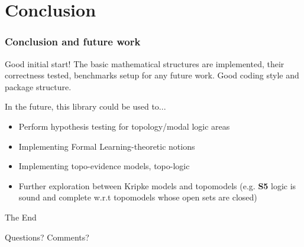\documentclass[
	11pt, %
	aspectratio=1610, %
]{beamer}
\begin{document}
\section{Conclusion}


\begin{frame}
	\frametitle{Conclusion and future work}

	Good initial start! The basic mathematical structures are implemented, their
	correctness tested, benchmarks setup for any future work. Good coding style and package structure.

	\bigskip\bigskip

	In the future, this library could be used to...

	\begin{itemize}
		\item Perform hypothesis testing for topology/modal logic areas
		\item Implementing Formal Learning-theoretic notions
		\item Implementing topo-evidence models, topo-logic
		\item Further exploration between Kripke models and topomodels (e.g. \textbf{S5} logic is sound and complete w.r.t topomodels whose open sets are closed)
	\end{itemize}
\end{frame}


\begin{frame}[plain] %
	\begin{center}
		{\Huge The End}

		\bigskip\bigskip %

		{\LARGE Questions? Comments?}
	\end{center}
\end{frame}

\end{document}
